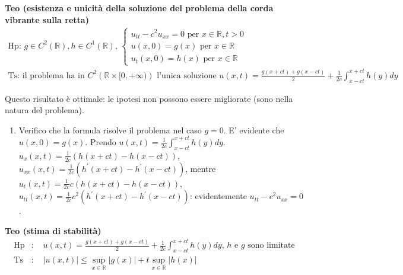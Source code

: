 \documentclass{article}
\begin{document}
\textbf{Teo (esistenza e unicit\`{a} della soluzione del problema della
corda vibrante sulla retta)}%
\begin{gather*}
\text{Hp: }g\in C^{2}\left( 
\mathbb{R}
\right) ,h\in C^{1}\left( 
\mathbb{R}
\right) \text{, }\left\{ 
\begin{array}{c}
u_{tt}-c^{2}u_{xx}=0\text{ per }x\in 
\mathbb{R}
,t>0 \\ 
u\left( x,0\right) =g\left( x\right) \text{ per }x\in 
\mathbb{R}
\\ 
u_{t}\left( x,0\right) =h\left( x\right) \text{ per }x\in 
\mathbb{R}%
\end{array}%
\right. \\
\text{Ts: il problema ha in }C^{2}\left( 
\mathbb{R}
\times \lbrack 0,+\infty )\right) \text{ l'unica soluzione }u\left(
x,t\right) =\frac{g\left( x+ct\right) +g\left( x-ct\right) }{2}+\frac{1}{2c}%
\int_{x-ct}^{x+ct}h\left( y\right) dy
\end{gather*}

Questo risultato \`{e} ottimale: le ipotesi non possono essere migliorate
(sono nella natura del problema).

\begin{enumerate}
\item Verifico che la formula risolve il problema nel caso $g=0$. E'
evidente che $u\left( x,0\right) =g\left( x\right) $. Prendo $u\left(
x,t\right) =\frac{1}{2c}\int_{x-ct}^{x+ct}h\left( y\right) dy$. $u_{x}\left(
x,t\right) =\frac{1}{2c}\left( h\left( x+ct\right) -h\left( x-ct\right)
\right) $, $u_{xx}\left( x,t\right) =\frac{1}{2c}\left( h^{\prime }\left(
x+ct\right) -h^{\prime }\left( x-ct\right) \right) $, mentre $u_{t}\left(
x,t\right) =\frac{1}{2c}c\left( h\left( x+ct\right) -h\left( x-ct\right)
\right) $, $u_{tt}\left( x,t\right) =\frac{1}{2c}c^{2}\left( h^{\prime
}\left( x+ct\right) -h^{\prime }\left( x-ct\right) \right) $: evidentemente $%
u_{tt}-c^{2}u_{xx}=0$.
\end{enumerate}

\textbf{Teo (stima di stabilit\`{a})}%
\begin{eqnarray*}
\text{Hp} &\text{: }&u\left( x,t\right) =\frac{g\left( x+ct\right) +g\left(
x-ct\right) }{2}+\frac{1}{2c}\int_{x-ct}^{x+ct}h\left( y\right) dy\text{, }h%
\text{ e }g\text{ sono limitate} \\
\text{Ts} &\text{: }&\left\vert u\left( x,t\right) \right\vert \leq
\sup_{x\in 
\mathbb{R}
}\left\vert g\left( x\right) \right\vert +t\sup_{x\in 
\mathbb{R}
}\left\vert h\left( x\right) \right\vert
\end{eqnarray*}
\end{document}
